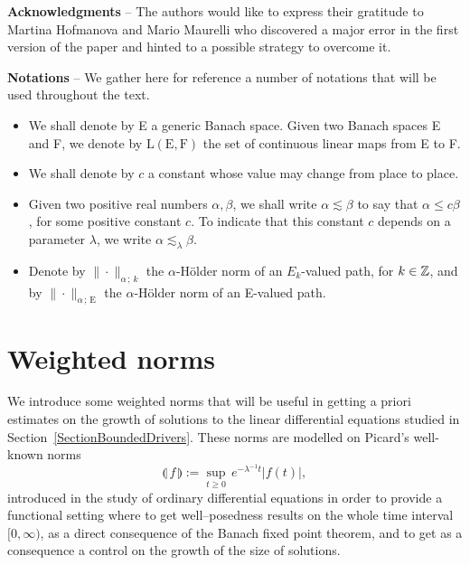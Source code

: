 \documentclass[11pt,a4paper]{amsart}
\renewcommand{\leq}{\leqslant}
\renewcommand{\geq}{\geqslant}
\theoremstyle{plain}%
\theoremstyle{definition}
\theoremstyle{remark}
\numberwithin{equation}{section} %
\begin{document}
\bigskip

\noindent \textbf{Acknowledgments} -- The authors would like to express their gratitude to Martina Hofmanova and Mario Maurelli who discovered a major error in the first version of the paper and hinted to a possible strategy to overcome it.
\bigskip

\noindent \textbf{Notations} -- We gather here for reference a number of notations that will be used throughout the text.
\begin{itemize}
   \item We shall denote by E a generic Banach space. Given two Banach spaces E and F, we denote by $\textrm{L}(\textrm{E},\textrm{F})$ the set of continuous linear maps from E to F. \vspace{0.1cm}
   \item We shall denote by $c$ a constant whose value may change from place to place. \vspace{0.1cm}
   \item Given two positive real numbers $\alpha,\beta$, we shall write $\alpha \lesssim \beta$ to say that $\alpha\leq c\beta$, for some positive constant $c$. To indicate that this constant $c$ depends on a parameter $\lambda$, we write $\alpha \lesssim_\lambda \beta$. \vspace{0.1cm}
   \item Denote by $\|\cdot\|_{\alpha\,;\,k}$ the $\alpha$-H\"older norm of an $E_k$-valued path, for $k\in\mathbb{Z}$, and by $\|\cdot\|_{\alpha\,;\,\textrm{E}}$ the $\alpha$-H\"older norm of an E-valued path.
\end{itemize}


\bigskip

\section{Weighted norms}
\label{SectionWeightedNorms}

We introduce  some weighted norms that will be useful in getting a priori estimates on the growth of solutions to the linear differential equations studied in Section~\ref{SectionBoundedDrivers}. These norms are modelled on Picard's well-known norms
$$
\llparenthesis\, f \,\rrparenthesis := \underset{t\geq 0}{\sup}\,e^{-\lambda^{-1} t}| f(t) |,
$$
introduced in the study of ordinary differential equations in order to provide a functional setting where to get well--posedness results on the whole time interval $[0,\infty)$, as a direct consequence of the Banach fixed point theorem, and to get as a consequence a control on the growth of the size of solutions. 
\end{document}
